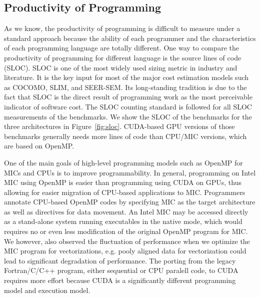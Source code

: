 \subsection{Productivity of Programming} 
As we know, the productivity of programming is difficult to measure under a standard approach because the ability of each programmer and the characteristics of each programming language are totally different. One way to compare the productivity of programming for different language is the source lines of code (SLOC). SLOC is one of the most widely used sizing metric in industry and literature. It is the key input for most of the major cost estimation models such as COCOMO, SLIM, and SEER-SEM.  Its long-standing tradition is due to the fact that SLOC is the direct result of programming work as the most perceivable indicator of software cost. The SLOC counting standard \cite{nguyen2007sloc} is followed for all SLOC measurements of the benchmarks. We show the SLOC of the benchmarks for 
the three architectures in Figure~\ref{fig:sloc}. CUDA-based GPU versions of those benchmarks generally needs more lines of code than 
CPU/MIC versions, which are based on OpenMP.  

One of the main goals of high-level programming models such as OpenMP for MICs and CPUs is to improve programmability. 
In general, programming on Intel MIC using OpenMP is easier than programming using CUDA on GPUs, thus allowing for easier 
migration of CPU-based applications to MIC. %
Programmers annotate CPU-based OpenMP codes by specifying MIC as the target architecture as well as directives for data movement. 
An Intel MIC may be accessed directly as a stand-alone system running executables in the native mode, which would requires no or even 
less modification of the original OpenMP program for MIC. We however, also observed the fluctuation of performance when we optimize
the MIC program for vectorizations, e.g. pooly aligned data for vectorization could lead to significant degradation of performance. 
The porting from the legacy Fortran/C/C++ program, either sequential or CPU paralell code, to CUDA 
requires more effort because CUDA is a significantly different programming model and execution model.


